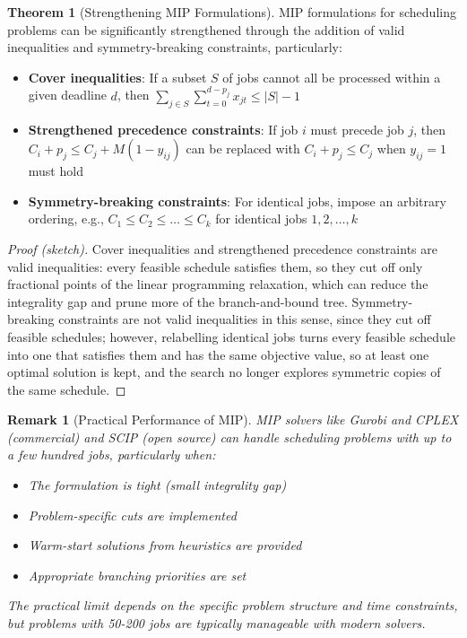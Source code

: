 \documentclass{article}
\newtheorem{remark}{Remark}
\theoremstyle{definition}
\newtheorem{theorem}{Theorem}
\begin{document}
\begin{theorem}[Strengthening MIP Formulations]
MIP formulations for scheduling problems can be significantly strengthened through the addition of valid inequalities and symmetry-breaking constraints, particularly:

\begin{itemize}
    \item \textbf{Cover inequalities}: If a subset $S$ of jobs cannot all be processed within a given deadline $d$, then $\sum_{j \in S} \sum_{t=0}^{d-p_j} x_{jt} \leq |S|-1$
    
    \item \textbf{Strengthened precedence constraints}: If job $i$ must precede job $j$, then $C_i + p_j \leq C_j + M(1-y_{ij})$ can be replaced with $C_i + p_j \leq C_j$ when $y_{ij}=1$ must hold
    
    \item \textbf{Symmetry-breaking constraints}: For identical jobs, impose an arbitrary ordering, e.g., $C_1 \leq C_2 \leq \ldots \leq C_k$ for identical jobs $1, 2, \ldots, k$
\end{itemize}

\begin{proof}[Proof (sketch)]
Cover inequalities and strengthened precedence constraints are valid inequalities: every feasible schedule satisfies them, so they cut off only fractional points of the linear programming relaxation, which can reduce the integrality gap and prune more of the branch-and-bound tree. Symmetry-breaking constraints are not valid inequalities in this sense, since they cut off feasible schedules; however, relabelling identical jobs turns every feasible schedule into one that satisfies them and has the same objective value, so at least one optimal solution is kept, and the search no longer explores symmetric copies of the same schedule.
\end{proof}
\end{theorem}

\begin{remark}[Practical Performance of MIP]
MIP solvers like Gurobi and CPLEX (commercial) and SCIP (open source) can handle scheduling problems with up to a few hundred jobs, particularly when:
\begin{itemize}
    \item The formulation is tight (small integrality gap)
    \item Problem-specific cuts are implemented
    \item Warm-start solutions from heuristics are provided
    \item Appropriate branching priorities are set
\end{itemize}
The practical limit depends on the specific problem structure and time constraints, but problems with 50-200 jobs are typically manageable with modern solvers.
\end{remark}
\end{document}
